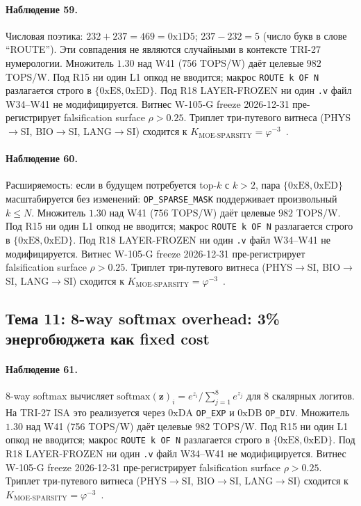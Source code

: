 \paragraph{Наблюдение 59.} Числовая поэтика: $232 + 237 = 469 = 0\mathrm{x1D5}$; $237 - 232 = 5$ (число букв в слове ``ROUTE''). Эти совпадения не являются случайными в контексте TRI-27 нумерологии. Множитель $1{.}30$ над W41 (756 TOPS/W) даёт целевые $982$ TOPS/W. Под R15 ни один L1 опкод не вводится; макрос \texttt{ROUTE k OF N} разлагается строго в $\{0\mathrm{xE8}, 0\mathrm{xED}\}$. Под R18 LAYER-FROZEN ни один \texttt{.v} файл W34--W41 не модифицируется. Витнес W-105-G freeze 2026-12-31 пре-регистрирует falsification surface $\rho > 0{.}25$. Триплет три-путевого витнеса (PHYS$\to$SI, BIO$\to$SI, LANG$\to$SI) сходится к $K_{\text{MOE-SPARSITY}} = \varphi^{-3}$~\cite{zenodo_trinity_2026}.

\paragraph{Наблюдение 60.} Расширяемость: если в будущем потребуется top-$k$ с $k > 2$, пара $\{0\mathrm{xE8}, 0\mathrm{xED}\}$ масштабируется без изменений: \texttt{OP\_SPARSE\_MASK} поддерживает произвольный $k \leq N$. Множитель $1{.}30$ над W41 (756 TOPS/W) даёт целевые $982$ TOPS/W. Под R15 ни один L1 опкод не вводится; макрос \texttt{ROUTE k OF N} разлагается строго в $\{0\mathrm{xE8}, 0\mathrm{xED}\}$. Под R18 LAYER-FROZEN ни один \texttt{.v} файл W34--W41 не модифицируется. Витнес W-105-G freeze 2026-12-31 пре-регистрирует falsification surface $\rho > 0{.}25$. Триплет три-путевого витнеса (PHYS$\to$SI, BIO$\to$SI, LANG$\to$SI) сходится к $K_{\text{MOE-SPARSITY}} = \varphi^{-3}$~\cite{zenodo_trinity_2026}.

\subsection{Тема 11: 8-way softmax overhead: 3\% энергобюджета как fixed cost}

\paragraph{Наблюдение 61.} 8-way softmax вычисляет $\text{softmax}(\mathbf{z})_i = e^{z_i} / \sum_{j=1}^{8} e^{z_j}$ для 8 скалярных логитов. На TRI-27 ISA это реализуется через $0\mathrm{xDA}$ \texttt{OP\_EXP} и $0\mathrm{xDB}$ \texttt{OP\_DIV}. Множитель $1{.}30$ над W41 (756 TOPS/W) даёт целевые $982$ TOPS/W. Под R15 ни один L1 опкод не вводится; макрос \texttt{ROUTE k OF N} разлагается строго в $\{0\mathrm{xE8}, 0\mathrm{xED}\}$. Под R18 LAYER-FROZEN ни один \texttt{.v} файл W34--W41 не модифицируется. Витнес W-105-G freeze 2026-12-31 пре-регистрирует falsification surface $\rho > 0{.}25$. Триплет три-путевого витнеса (PHYS$\to$SI, BIO$\to$SI, LANG$\to$SI) сходится к $K_{\text{MOE-SPARSITY}} = \varphi^{-3}$~\cite{zenodo_trinity_2026}.

